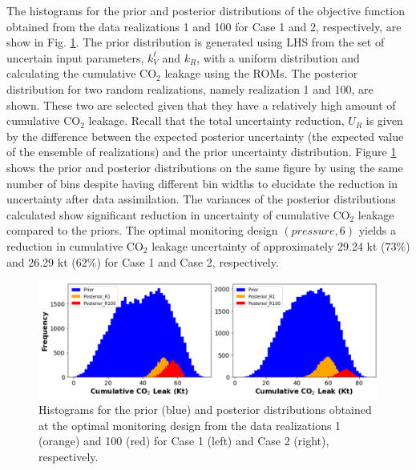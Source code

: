 \documentclass[a4paper,fleqn]{cas-sc}
\begin{document}
The histograms for the prior and posterior distributions of the objective function obtained from the data realizations 1 and 100 for Case 1 and 2, respectively, are show in Fig. \ref{ur_dist}. The prior distribution is generated using LHS from the set of uncertain input parameters, $k_V^\ell$ and $k_R$, with a uniform distribution and calculating the cumulative CO$_2$ leakage using the ROMs. The posterior distribution for two random realizations, namely realization 1 and 100, are shown. These two are selected given that they have a relatively high amount of cumulative CO$_2$ leakage. Recall that the total uncertainty reduction, $U_R$ is given by the difference between the expected posterior uncertainty (the expected value of the ensemble of realizations) and the prior uncertainty distribution. Figure \ref{ur_dist} shows the prior and posterior distributions on the same figure by using the same number of bins despite having different bin widths to elucidate the reduction in uncertainty after data assimilation. The variances of the posterior distributions calculated show significant reduction in uncertainty of cumulative CO$_2$ leakage compared to the priors. The optimal monitoring design $(pressure, 6)$ yields a reduction in cumulative CO$_2$ leakage uncertainty of approximately 29.24 kt ($73\%$) and 26.29 kt ($62\%$) for Case 1 and Case 2, respectively. 

\begin{figure}
    \centering
    \includegraphics[width=16cm]{figs/Figure 12.pdf}
    \caption{Histograms for the prior (blue) and posterior distributions obtained at the optimal monitoring design from the data realizations 1 (orange) and 100 (red) for Case 1 (left) and Case 2 (right), respectively.}
    \label{ur_dist}
\end{figure}
\end{document}
